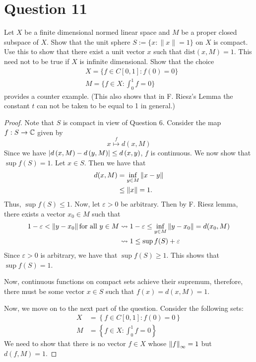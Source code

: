 \section{Question 11}
\horz
Let $X$ be a finite dimensional normed linear space and $M$ be a proper closed subspace of $X$. Show that the unit sphere  $S := \{x: \|x\|=1\}$ on $X$ is compact. Use this to show that there exist a unit vector $x$ such that $\text{dist}(x, M) = 1.$ This need not to be true if $X$ is infinite dimensional. Show that the choice
    \begin{align*}
       & X = \{f \in C[0, 1] : f(0) = 0\}\\
        &M= \{f \in X : \int_{0}^{1}f = 0\}
    \end{align*}
provides a counter example. (This also shows that in F. Riesz's Lemma the constant $t$ can not be taken to be equal to 1 in general.)
\horz

\begin{proof}
    Note that $S$ is compact in view of Question 6.
    Consider the map $f: S \to \mathbb C$ given by 
    \begin{equation*}
	x \stackrel{f}{\mapsto} d\left( x, M \right)
    \end{equation*}
    Since we have $\left\lvert d\left( x,M \right) -d\left( y,M \right) \right\rvert \le d\left( x,y \right)$, $f$ is continuous. We now show that $\sup f\left( S \right) = 1$.
    Let $x\in S$. Then we have that
    \begin{align*}
	d(x,M) &= \inf_{y \in M} \left\lVert x-y \right\rVert \\
	&\le \left\lVert x \right\rVert=1\text{.} \\
    \end{align*}
    Thus, $\sup f\left( S \right) \le 1$. Now, let $\varepsilon >0$ be arbitrary. Then by F. Riesz lemma, there exists a vector $x_{0} \in M$ such that 
    \begin{align*}
	1-\varepsilon < \left\lVert y-x_{0} \right\rVert \text{for all } y \in M &\leadsto 1-\varepsilon \le \inf_{y\in M} \left\lVert y-x_{0} \right\rVert=d(x_{0},M) \\
	& \leadsto 1\le \sup f(S) + \varepsilon
    \end{align*}
    Since $\varepsilon > 0$ is arbitrary, we have that $\sup f\left( S \right) \ge 1$. This shows that $\sup f\left( S \right) =1$.

    Now, continuous functions on compact sets achieve their supremum, therefore, there must be some vector $x \in S$ such that $f(x)=d(x,M) =1$.

    Now, we move on to the next part of the question. Consider the following sets:
    \begin{align*}
	X&= \left\{ f \in C[0,1] : f(0)=0 \right\} \\
	M&= \left\{ f\in X : \int_{0}^{1} f = 0 \right\}
    \end{align*}
    We need to show that there is no vector $f\in X$ whose $\left\lVert f \right\rVert_{\infty}=1$ but $d(f,M)=1$.
\end{proof}
